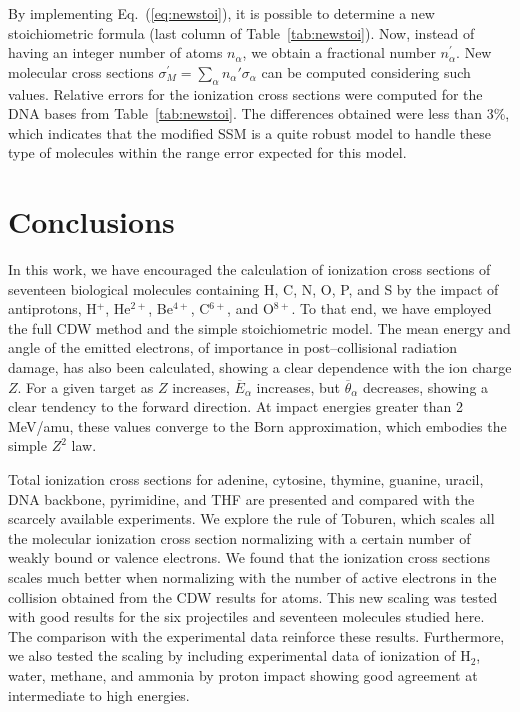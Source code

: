 \documentclass[preprint,showpacs]{revtex4}
\begin{document}
By implementing Eq.~(\ref{eq:newstoi}), it is possible to determine a 
new stoichiometric formula (last column of Table~\ref{tab:newstoi}). 
Now, instead of having an integer number of atoms $n_{\alpha}$, we obtain 
a fractional number $n_{\alpha}^{\prime}$. New molecular cross sections 
$\sigma^{\prime}_{M}=\sum_{\alpha}n_{\alpha}'\sigma_{\alpha}$ can be 
computed considering 
such values. Relative errors for the ionization cross sections were 
computed for the DNA bases from Table~\ref{tab:newstoi}. The differences 
obtained were less than 3\%, which indicates that the modified 
SSM is a quite robust model to handle these type of molecules within 
the range error expected for this model.

\section{Conclusions}

In this work, we have encouraged the calculation of ionization cross 
sections of seventeen biological molecules containing H, C, N, O, P, and 
S by the impact of antiprotons, H$^{+}$, He$^{2+}$, Be$^{4+}$, C$^{6+}$, 
and O$^{8+}$. To that end, we have employed the full CDW method and the 
simple stoichiometric model. 
The mean energy and angle of the emitted electrons, of importance in 
post--collisional radiation damage,  has also been calculated, showing 
a clear dependence with the ion charge $Z$. For a given target as $Z$ 
increases, $\overline{E}_{\alpha}$
increases, but $\overline{\theta}_{\alpha}$ decreases, showing a clear 
tendency to the forward direction. At impact
energies greater than 2 MeV/amu, these values converge to the Born
approximation, which embodies the simple $Z^{2}$ law. 

Total ionization cross sections for adenine, cytosine, thymine, guanine, 
uracil, DNA backbone, pyrimidine, and THF are presented and compared 
with the scarcely available experiments. We explore the rule of 
Toburen, which scales all the molecular ionization cross section 
normalizing with a certain number of weakly bound or valence electrons. 
We found that the ionization cross 
sections scales much better when normalizing with the number of active 
electrons in the collision obtained from the CDW results for atoms. 
This new scaling was tested with good results for the six 
projectiles and seventeen molecules studied here. The comparison with 
the experimental data reinforce these results. Furthermore, we also tested
the scaling by including experimental data of ionization of H$_2$, 
water, methane, and ammonia by proton impact showing good agreement at
intermediate to high energies.
\end{document}
